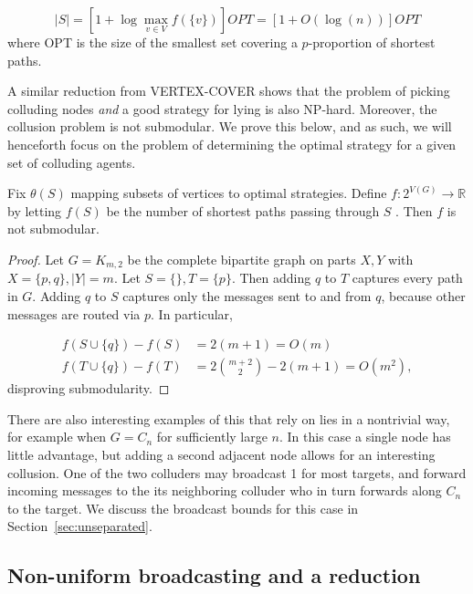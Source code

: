 \documentclass{comnet}
\providecommand{\DIFadd}[1]{{\protect\color{blue}\uwave{#1}}} %
\providecommand{\DIFaddbegin}{} %
\providecommand{\DIFaddend}{} %
\begin{document}
$$ |S| = \left [ 1 + \log \max_{v \in V} f(\{ v \}) \right ] OPT
       = \left [ 1 + O(\log(n)) \right ] OPT$$
where OPT is the size of the smallest set covering a $p$-proportion of shortest
paths. 

A similar reduction from VERTEX-COVER shows that the problem of picking
colluding nodes \emph{and} a good strategy for lying is also NP-hard. Moreover,
the collusion problem is not submodular. We prove this below, and as such, we
will henceforth focus on the problem of determining the optimal strategy for a
given set of colluding agents.

\begin{proposition} \label{prop:not-submodular}

Fix $\theta(S)$ mapping subsets of vertices to optimal strategies. Define $f:
2^{V(G)} \to \mathbb{R}$ by letting $f(S)$ be the number of shortest paths
passing through $S$ \DIFaddbegin \DIFadd{when $S$ uses the strategy $\theta(S)$}\DIFaddend . Then $f$ is not
submodular.
\DIFaddbegin 

\DIFaddend \end{proposition}

\begin{proof}

Let $G = K_{m,2}$ be the complete bipartite graph on parts $X,Y$ with $X = \{
p,q \}, |Y|=m$. Let $S = \{ \}, T = \{ p \}$. Then adding $q$ to $T$ captures
every path in $G$. Adding $q$ to $S$ captures only the messages sent to and
from $q$, because other messages are routed via $p$. In particular,

\begin{align*}
   f(S \cup \{ q \}) - f(S) &= 2(m+1) = O(m) \\ 
   f(T \cup \{ q \}) - f(T) &= 2 \binom{m+2}{2} - 2(m+1) = O(m^2),
\end{align*}
disproving submodularity. 
\end{proof}

There are also interesting examples of this that rely on lies in a nontrivial
way, for example when $G = C_n$ for sufficiently large $n$. In this case a
single node has little advantage, but adding a second adjacent node allows for
an interesting collusion. One of the two colluders may broadcast 1 for most
targets, and forward incoming messages to the its neighboring colluder who in
turn forwards along $C_n$ to the target. We discuss the broadcast bounds for
this case in Section~\ref{sec:unseparated}.

\subsection{Non-uniform broadcasting and a reduction} \label{sec:reduction}
\end{document}
